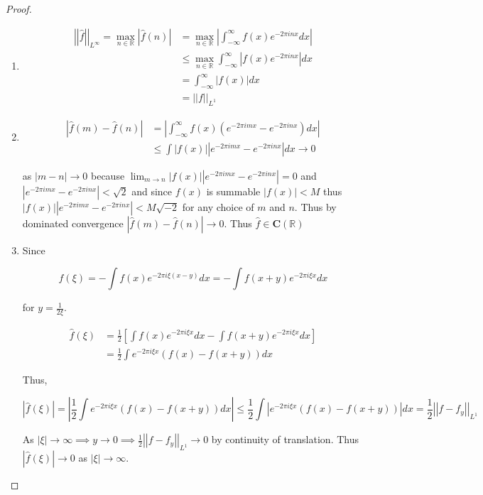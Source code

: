 \documentclass{article}
\newcommand{\h}[1]{\hat{#1}}
\newcommand{\R}{\mathbb{R}}
\newcommand{\abs}[1]{\left\lvert #1\right\rvert}
\newcommand{\aabs}[1]{\left\lvert \left\lvert #1 \right\rvert\right\rvert}
\begin{document}
\begin{proof}
    \begin{enumerate}
        \item \begin{align*}
            \aabs{\h{f}}_{L^{\infty}} = \max_{n \in \R}\abs{\h{f}(n)} &= \max_{n \in \R} \abs{\int_{-\infty}^{\infty} f(x) e^{-2 \pi i n x} dx} \\
            &\leq \max_{n \in \R} \int_{-\infty}^{\infty} \abs{f(x) e^{-2 \pi i n x}} dx \\
            &= \int_{-\infty}^{\infty} \abs{f(x)} dx \\
            &= \aabs{f}_{L^{1}}
        \end{align*}
        \item \begin{align*}
            \abs{\h{f}(m) - \h{f}(n)} &= \abs{\int_{-\infty}^{\infty}f(x)(e^{-2 \pi i m x} - e^{-2 \pi i n x}) dx} \\
            &\leq \int \abs{f(x)} \abs{e^{-2 \pi i m x} - e^{-2 \pi i n x}} dx \to 0
        \end{align*}

        as $\abs{m - n} \to 0$ because $\lim_{m \to n} \abs{f(x)} \abs{e^{-2 \pi i m x} - e^{-2 \pi i n x}} = 0$ and $\abs{e^{-2 \pi i m x} - e^{-2 \pi i n x}} < \sqrt{2}$ and since $f(x)$ is summable $\abs{f(x)} < M$ thus $\abs{f(x)} \abs{e^{-2 \pi i m x} - e^{-2 \pi i n x}} < M \sqrt{-2}$ for any choice of $m$ and $n$. Thus by dominated convergence $\abs{\h{f}(m) - \h{f}(n)} \to 0$. Thus $\h{f} \in \mathbf{C}(\R)$        

        \item
        Since
        
        \begin{equation*}
            \h{f}(\xi) = -\int f(x) e^{-2 \pi i \xi(x - y)} dx = -\int f(x + y) e^{-2 \pi i \xi x} dx
        \end{equation*}

        for $y = \frac{1}{2\xi}$.
        
        \begin{align*}
            \h{f}(\xi) &= \frac{1}{2}\left[\int f(x) e^{-2 \pi i \xi x} dx - \int f(x + y) e^{-2 \pi i \xi x} dx\right] \\
            &= \frac{1}{2}\int e^{-2 \pi i \xi x}(f(x) - f(x + y)) dx
        \end{align*}

        Thus,

        \begin{equation*}
            \abs{\h{f}(\xi)} = \abs{\frac{1}{2}\int e^{-2 \pi i \xi x}(f(x) - f(x + y)) dx} \leq \frac{1}{2} \int \abs{ e^{-2 \pi i \xi x}(f(x) - f(x + y))}dx = \frac{1}{2}\aabs{f - f_{y}}_{L^1}
        \end{equation*}
        
        As $\abs{\xi} \to \infty \implies y \to 0 \implies \frac{1}{2}\aabs{f - f_{y}}_{L^1} \to 0$ by continuity of translation. Thus $\abs{\h{f}(\xi)} \to 0$ as $\abs{\xi} \to \infty$.    
    \end{enumerate}
\end{proof}
\end{document}
